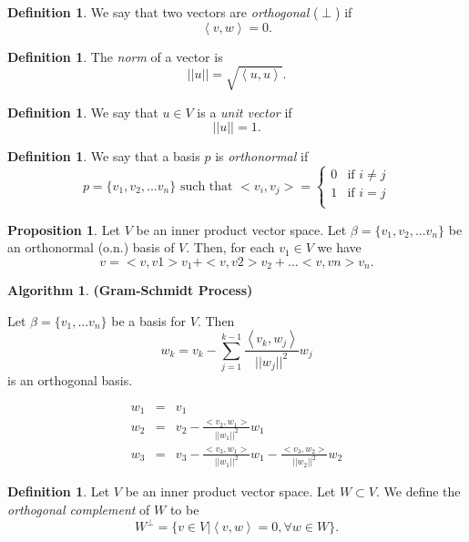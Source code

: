 \documentclass[a5paper]{article}
\theoremstyle{definition}%
\numberwithin{theorem}{section} %
\newtheorem{algorithm}[theorem]{Algorithm}
\newtheorem{definition}[theorem]{Definition}
\newtheorem{proposition}[theorem]{Proposition}
\begin{document}
\begin{definition} 
We say that two vectors are \emph{orthogonal} ($\perp$) if 
$$\left<v,w\right>=0.$$
\end{definition}

\begin{definition}
The \emph{norm} of a vector is 
$$||u||=\sqrt{\left<u,u\right>}.$$
\end{definition}

\begin{definition}
We say that $u \in V$ is a \emph{unit vector} if $$||u|| = 1.$$
\end{definition}

\begin{definition}
We say that a basis $p$ is \emph{orthonormal} if 
\[p=\{v_1, v_2, ... v_n\} \text{ such that }
<v_i, v_j> = 
%
\begin{cases}
0 & \text{if }i \neq j \\
1 & \text{if }i = j \\
\end{cases}
\]
\end{definition}

\begin{proposition}
Let $V$ be an inner product vector space. Let $\beta =\{v_1, v_2, ... v_n\}$ be an orthonormal (o.n.) basis of $V$. Then, for each $v_1 \in V$ we have
$$ v = <v,v1>v_1 + <v,v2>v_2 + ... <v,vn>v_n.$$ 
\end{proposition}

\begin{algorithm}
\textbf{(Gram-Schmidt Process)}

Let $\beta = \{v_1, ... v_n\}$ be a basis for $V$. Then 
$$w_k = v_k - \sum_{j=1}^{k-1} \frac{\left<v_k,w_j\right>}{||w_j||^2}w_j$$ is an orthogonal basis. 

\[
\begin{array}{rcl}
w_1 &=& v_1\\
w_2 &=& v_2 - \frac{<v_2, w_1>}{||w_1||^2}w_1 \\
w_3 &=& v_3 - \frac{<v_3, w_1>}{||w_1||^2}w_1 - \frac{<v_3, w_2>}{||w_2||^2}w_2
\end{array}
\]
\end{algorithm}

\begin{definition}
Let $V$ be an inner product vector space. Let $W \subset V$. We define the \emph{orthogonal complement} of $W$ to be 
$$W^{\perp} = \{v \in V | \left<v,w\right>=0, \forall w \in W\}.$$
\end{definition}
\end{document}
